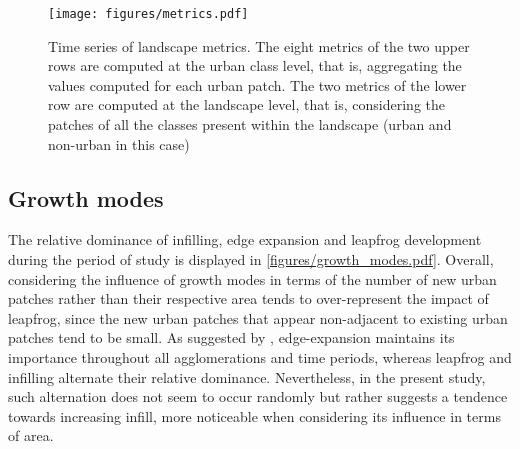 \documentclass[10pt,letterpaper]{article}
\begin{document}
\begin{figure}[ht]
  \begin{adjustwidth}{-.4\textwidth}{0cm}
    \centering  
    \texttt{[image: figures/metrics.pdf]}
    \vspace{.5em}
    \caption[Time series of landscape metrics]{\label{figures/metrics.pdf}Time series of landscape metrics. The eight metrics of the two upper rows are computed at the urban class level, that is, aggregating the values computed for each urban patch. The two metrics of the lower row are computed at the landscape level, that is, considering the patches of all the classes present within the landscape (urban and non-urban in this case)}
  \end{adjustwidth}
\end{figure}


\subsection*{Growth modes}

The relative dominance of infilling, edge expansion and leapfrog development during the period of study is displayed in \autoref{figures/growth_modes.pdf}.
Overall, considering the influence of growth modes in terms of the number of new urban patches rather than their respective area tends to over-represent the impact of leapfrog, since the new urban patches that appear non-adjacent to existing urban patches tend to be small.
As suggested by \cite{li2013quantifying}, edge-expansion maintains its importance throughout all agglomerations and time periods, whereas leapfrog and infilling alternate their relative dominance.
Nevertheless, in the present study, such alternation does not seem to occur randomly but rather suggests a tendence towards increasing infill, more noticeable when considering its influence in terms of area.
\end{document}
